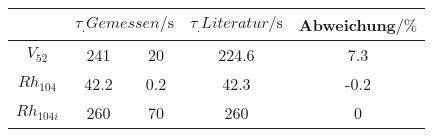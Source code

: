 \label{tab:tabFehler}
	\begin{tabular}{cc @{${}\pm{}$} ccS[table-format=1.1]}
		\toprule
		{} &   & {$\tau_.{Literatur}/\si{\second}$} & {Abweichung$/\% $}\\
		\midrule
		$V_{52}$	& 241		& 20	& 224.6	& 7.3 \\
		$Rh_{104}$	& 42.2	& 0.2	& 42.3	& -0.2 \\
		$Rh_{104i}$	& 260 		& 70	& 260		& 0 \\
		\bottomrule
	\end{tabular}
